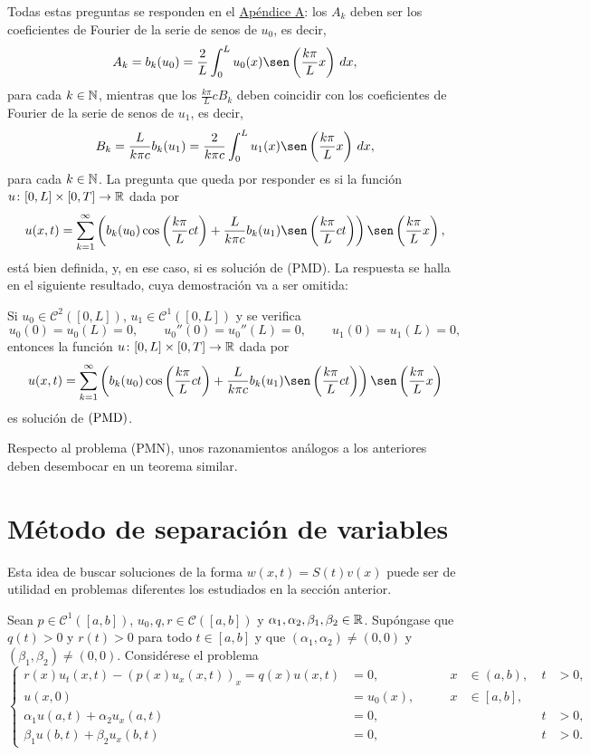 \documentclass[a4paper, 12pt, extrafontsizes]{memoir}
\begin{document}
Todas estas preguntas se responden en el \hyperref[A]{\color{gray}Apéndice A}: los $A_k$ deben ser los coeficientes de Fourier de la serie de senos de $u_0$, es decir,
\[A_k = b_k(u_0) = \frac{2}{L}\int_0^L u_0(x)\sen\left(\frac{k\pi}{L}x\right) \, dx,\]
para cada $k \in \mathbb N$, mientras que los $\frac{k\pi}{L}cB_k$ deben coincidir con los coeficientes de Fourier de la serie de senos de $u_1$, es decir,
\[B_k = \frac{L}{k\pi c}b_k(u_1) = \frac{2}{k\pi c}\int_0^L u_1(x)\sen\left(\frac{k\pi}{L}x\right) \, dx,\]
para cada $k \in \mathbb N$. La pregunta que queda por responder es si la función $u \colon [0,L] \times [0,T] \to \mathbb R$ dada por
\[u(x,t) = \sum_{k=1}^\infty\left(b_k(u_0)\cos\left(\frac{k\pi}{L}ct\right)+\frac{L}{k\pi c}b_k(u_1)\sen\left(\frac{k\pi}{L}ct\right)\right)\sen\left(\frac{k\pi}{L}x\right),\]
está bien definida, y, en ese caso, si es solución de (PMD). La respuesta se halla en el siguiente resultado, cuya demostración va a ser omitida:

\begin{theorem}
    Si $u_0 \in \mathcal{C}^2([0,L])$, $u_1 \in \mathcal{C}^1([0,L])$ y se verifica
    \[u_0(0)=u_0(L)=0, \qquad u_0''(0)=u_0''(L)= 0, \qquad u_1(0)=u_1(L)=0,\]
    entonces la función $u \colon [0,L] \times [0,T] \to \mathbb R$ dada por
    \[u(x,t) = \sum_{k=1}^\infty\left(b_k(u_0)\cos\left(\frac{k\pi}{L}ct\right)+\frac{L}{k\pi c}b_k(u_1)\sen\left(\frac{k\pi}{L}ct\right)\right)\sen\left(\frac{k\pi}{L}x\right)\]
    es solución de $(\textup{PMD})$.
\end{theorem}

Respecto al problema (PMN), unos razonamientos análogos a los anteriores deben desembocar en un teorema similar.

\section{Método de separación de variables}

Esta idea de buscar soluciones de la forma $w(x,t) = S(t)v(x)$ puede ser de utilidad en problemas diferentes los estudiados en la sección anterior.

Sean $p \in \mathcal{C}^1([a,b])$, $u_0, q,r \in \mathcal{C}([a,b])$ y $\alpha_1,\alpha_2,\beta_1,\beta_2 \in \mathbb R$. Supóngase que $q(t) > 0$ y $r(t) > 0$ para todo $t \in [a,b]$ y que $(\alpha_1,\alpha_2)\neq (0,0)$ y $(\beta_1,\beta_2)\neq (0,0)$. Considérese el problema
\[
        \left\{\begin{alignedat}{5}
            r(x)u_{t}(x,t)-(p(x)u_x(x,t)) _x = q(x)u(x,t) &= 0, \qquad & x &\in (a,b), \ & t &>0, \\
            u(x,0) &= u_0(x), \qquad & x &\in [a,b], & & \\
            \alpha_1u(a,t)+\alpha_2u_x(a,t) &= 0, \qquad & & & t &> 0, \\
            \beta_1u(b,t)+\beta_2u_x(b,t) &= 0, \qquad & & & t &> 0.
        \end{alignedat}\right.
\]
\end{document}
